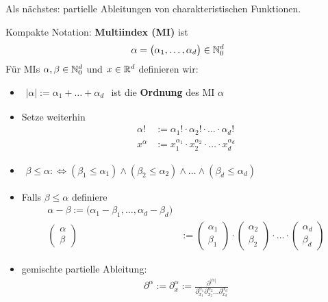 Als nächstes: partielle Ableitungen von charakteristischen Funktionen.

\begin{notation}
Kompakte Notation: \textbf{Multiindex (MI)} ist
\begin{align*}
\alpha=\big(\alpha_1,\ldots,\alpha_d\big)\in\mathbb{N}_0^d
\end{align*}
Für MIs $\alpha,\beta\in\mathbb{N}_0^d$ und $x\in\mathbb{R}^d$ definieren wir:
\begin{itemize}
\item $\begin{aligned}
|\alpha|:=\alpha_1+\ldots+\alpha_d
\end{aligned}$ ist die \textbf{Ordnung} des MI $\alpha$
\item Setze weiterhin
\begin{align*}
\alpha!&:=\alpha_1!\cdot\alpha_2!\cdot\ldots\cdot\alpha_d!\\
x^\alpha&:=x_1^{\alpha_1}\cdot x_2^{\alpha_2}\cdot\ldots\cdot x_d^{\alpha_d}
\end{align*}
\item $\begin{aligned}
\beta\leq\alpha:\Longleftrightarrow(\beta_1\leq\alpha_1)\wedge(\beta_2\leq\alpha_2)\wedge\ldots\wedge(\beta_d\leq\alpha_d)
\end{aligned}$ 
\item Falls $\beta\leq\alpha$ definiere
\begin{align*}
\alpha-\beta:=\big(\alpha_1-\beta_1,\ldots,\alpha_d-\beta_d\big)\\
\begin{pmatrix}
\alpha\\\beta
\end{pmatrix}&:=\begin{pmatrix}
\alpha_1\\\beta_1
\end{pmatrix}\cdot\begin{pmatrix}
\alpha_2\\\beta_2
\end{pmatrix}\cdot\ldots\cdot\begin{pmatrix}
\alpha_d\\\beta_d
\end{pmatrix}
\end{align*}
\item gemischte partielle Ableitung:
\begin{align*}
\partial^\alpha:=\partial_x^\alpha:=\frac{\partial^{|\alpha|}}{\partial_{x_1}^{\alpha_1}\partial_{x_2}^{\alpha_2}\ldots\partial_{x_d}^{\alpha_d}}
\end{align*}
\end{itemize}
\end{notation}


